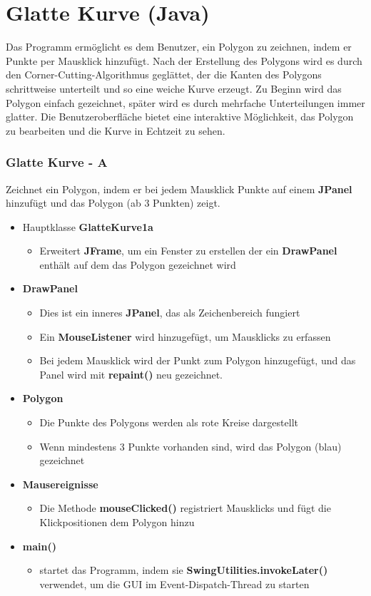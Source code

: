\chapter{Glatte Kurve (Java)}
Das Programm ermöglicht es dem Benutzer, ein Polygon zu zeichnen, indem er Punkte per Mausklick hinzufügt. Nach der Erstellung des Polygons wird es durch den Corner-Cutting-Algorithmus geglättet, der die Kanten des Polygons schrittweise unterteilt und so eine weiche Kurve erzeugt. Zu Beginn wird das Polygon einfach gezeichnet, später wird es durch mehrfache Unterteilungen immer glatter. Die Benutzeroberfläche bietet eine interaktive Möglichkeit, das Polygon zu bearbeiten und die Kurve in Echtzeit zu sehen.

\subsection*{Glatte Kurve - A}
Zeichnet ein Polygon, indem er bei jedem Mausklick Punkte auf einem \textbf{JPanel} hinzufügt und das Polygon (ab 3 Punkten) zeigt.
\begin{itemize}[itemsep=0pt]
   \item Hauptklasse \textbf{GlatteKurve1a}
   \begin{itemize}
    \item Erweitert \textbf{JFrame}, um ein Fenster zu erstellen der ein \textbf{DrawPanel} enthält auf dem das Polygon gezeichnet wird
   \end{itemize}
   \item \textbf{DrawPanel} 
   \begin{itemize}
    \item Dies ist ein inneres \textbf{JPanel}, das als Zeichenbereich fungiert
    \item Ein \textbf{MouseListener} wird hinzugefügt, um Mausklicks zu erfassen
    \item Bei jedem Mausklick wird der Punkt zum Polygon hinzugefügt, und das Panel wird mit \textbf{repaint()} neu gezeichnet.
   \end{itemize}
   \item \textbf{Polygon}
   \begin{itemize}
    \item Die Punkte des Polygons werden als rote Kreise dargestellt
    \item Wenn mindestens 3 Punkte vorhanden sind, wird das Polygon (blau) gezeichnet
   \end{itemize}
   \item \textbf{Mausereignisse}
   \begin{itemize}
    \item Die Methode \textbf{mouseClicked()} registriert Mausklicks und fügt die Klickpositionen dem Polygon hinzu
   \end{itemize}
   \item \textbf{main()}
   \begin{itemize}
    \item startet das Programm, indem sie \textbf{SwingUtilities.invokeLater()} verwendet, um die GUI im Event-Dispatch-Thread zu starten
   \end{itemize}
\end{itemize}
